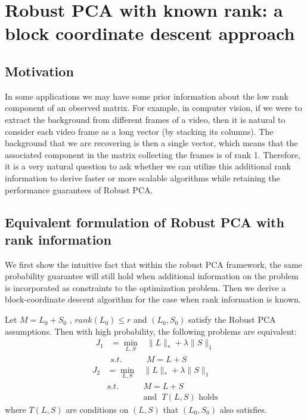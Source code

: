 \newpage
\section{Robust PCA with known rank: a block coordinate descent approach}

\subsection{Motivation}
In some applications we may have some prior information about the low rank component of an observed matrix. For example, in computer vision, if we were to extract the background from different frames of a video, then it is natural to consider each video frame as a long vector (by stacking its columns). The background that we are recovering is then a single vector, which means that the associated component in the matrix collecting the frames is of rank 1. Therefore, it is a very natural question to ask whether we can utilize this additional rank information to derive faster or more scalable algorithms while retaining the performance guarantees of Robust PCA.



\subsection{Equivalent formulation of Robust PCA with rank information}

We first show the intuitive fact that within the robust PCA framework, the same probability guarantee will still hold when additional information on the problem is incorporated as constraints to the optimization problem. Then we derive a block-coordinate descent algorithm for the case when rank information is known.
\begin{prop}
\label{prop:restriction prob}Let $M=L_{0}+S_{0}$ , $rank(L_{0})\le r$ and $(L_0,S_0)$
satisfy the Robust PCA assumptions. Then with high probability, the
following problems are equivalent:
%
\begin{eqnarray}
J_{1} & =\min_{L,S} & \|L\|_{*}+\lambda\|S\|_{1}\label{eq:general}\\
 & s.t. & M=L+S\nonumber
\end{eqnarray}
%
\begin{eqnarray}
J_{2} & =\min_{L,S} & \|L\|_{*}+\lambda\|S\|_{1}\label{eq:restricted}\\
 & s.t. & M=L+S\nonumber \\
 &  & \text{and }\;T(L,S)\text{ holds}\nonumber
\end{eqnarray}
%
where $T(L,S)$ are conditions on $(L,S)$ that $(L_{0},S_{0})$ also
satisfies.
\end{prop}

